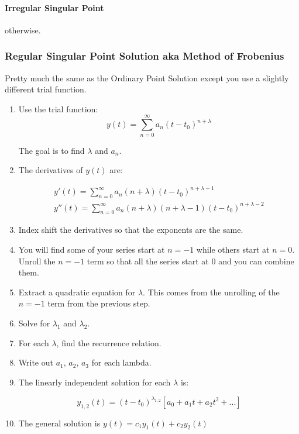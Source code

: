 \documentclass[11pt]{article}
\begin{document}
 \paragraph{Irregular Singular Point} otherwise.

\subsubsection*{Regular Singular Point Solution aka Method of Frobenius}
Pretty much the same as the Ordinary Point Solution except you use a slightly different trial function.

\begin{enumerate}

\item Use the trial function:
$$y(t)= \sum \limits_{n=0}^{\infty} a_n(t-t_0)^{n+\lambda}$$

The goal is to find $\lambda$ and $a_n$.

\item The derivatives of $y(t)$ are:

\begin{gather*}
y'(t)= \sum \limits_{n=0}^{\infty} a_n (n+\lambda) (t-t_0)^{n+\lambda-1} \\
y''(t)= \sum \limits_{n=0}^{\infty} a_n (n+\lambda) (n+\lambda-1)(t-t_0)^{n+\lambda-2}
\end{gather*}

\item Index shift the derivatives so that the exponents are the same.
\item You will find some of your series start at $n=-1$ while others start at $n=0$. Unroll the $n=-1$ term so that all the series start at 0 and you can combine them.
\item Extract a quadratic equation for $\lambda$. This comes from the unrolling of the $n=-1$ term from the previous step.
\item Solve for $\lambda_1$ and $\lambda_2$.
\item For each $\lambda$, find the recurrence relation.
\item Write out $a_1$, $a_2$, $a_3$ for each lambda.
\item The linearly independent solution for each $\lambda$ is:

$$y_{1,2}(t) = (t-t_0)^{\lambda_{1,2}}[a_0 + a_1t + a_2t^2 + ... ] $$

\item The general solution is $y(t) = c_1y_1(t) + c_2y_2(t)$

\end{enumerate}
\end{document}

